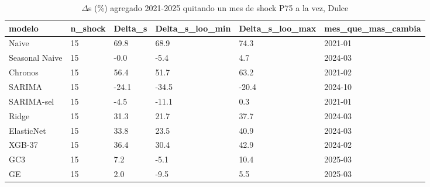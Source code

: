 \begin{table}[H]
\centering
\small
\caption{$\Delta$s (\%) agregado 2021-2025 quitando un mes de shock P75 a la vez, Dulce}
\label{tab:T12_loo_agregado_dulce}
\begin{tabular}{llllll}
\toprule
modelo & n\_shock & Delta\_s & Delta\_s\_loo\_min & Delta\_s\_loo\_max & mes\_que\_mas\_cambia \\
\midrule
Naive & 15 & 69.8 & 68.9 & 74.3 & 2021-01 \\
Seasonal Naive & 15 & -0.0 & -5.4 & 4.7 & 2024-03 \\
Chronos & 15 & 56.4 & 51.7 & 63.2 & 2021-02 \\
SARIMA & 15 & -24.1 & -34.5 & -20.4 & 2024-10 \\
SARIMA-sel & 15 & -4.5 & -11.1 & 0.3 & 2021-01 \\
Ridge & 15 & 31.3 & 21.7 & 37.7 & 2024-03 \\
ElasticNet & 15 & 33.8 & 23.5 & 40.9 & 2024-03 \\
XGB-37 & 15 & 36.4 & 30.4 & 42.9 & 2024-02 \\
GC3 & 15 & 7.2 & -5.1 & 10.4 & 2025-03 \\
GE & 15 & 2.0 & -9.5 & 5.5 & 2025-03 \\
\bottomrule
\end{tabular}
\end{table}